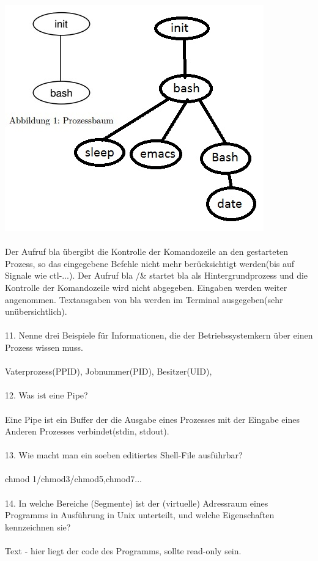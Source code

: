 \documentclass{article}
\begin{document}
\includegraphics{Ti1.jpeg}
\\
\\
Der Aufruf bla \"ubergibt die Kontrolle der Komandozeile an den gestarteten Prozess, so das eingegebene Befehle nicht mehr ber\"ucksichtigt werden(bis auf Signale wie ctl-...). Der Aufruf bla /& startet bla als Hintergrundprozess und die Kontrolle der Komandozeile wird nicht abgegeben. Eingaben werden weiter angenommen. Textausgaben von bla werden im Terminal ausgegeben(sehr un\"ubersichtlich). 
\\
\\
11. Nenne drei Beispiele für Informationen, die der Betriebssystemkern über einen Prozess
wissen muss.
\\
\\
Vaterprozess(PPID), Jobnummer(PID), Besitzer(UID),
\\
\\
12. Was ist eine Pipe?
\\
\\
Eine Pipe ist ein Buffer der die Ausgabe eines Prozesses mit der Eingabe eines Anderen Prozesses verbindet(stdin, stdout).
\\
\\
13. Wie macht man ein soeben editiertes Shell-File ausführbar?
\\
\\
chmod 1/chmod3/chmod5,chmod7...
\\
\\
14. In welche Bereiche (Segmente) ist der (virtuelle) Adressraum eines Programms in Ausführung in Unix unterteilt, und welche Eigenschaften kennzeichnen sie?
\\
\\
Text - hier liegt der code des Programms, sollte read-only sein.
\end{document}
